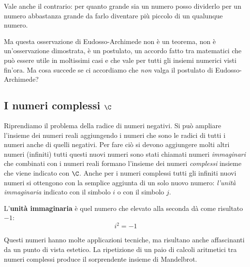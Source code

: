 Vale anche il contrario: per quanto grande sia un numero posso dividerlo 
per un numero abbastanza grande da farlo diventare più piccolo di un 
qualunque numero.

Ma questa osservazione di Eudosso-Archimede non è un teorema, non è 
un'osservazione dimostrata, è un postulato, un accordo fatto tra matematici 
che può essere utile in moltissimi casi e che vale per tutti gli insiemi 
numerici visti fin'ora. 
Ma cosa succede se ci accordiamo che \emph{non} valga il postulato di 
Eudosso-Archimede?

\subsection{I numeri complessi \(\C\)}
\label{subsec:insnum_complessi}

Riprendiamo il problema della radice di numeri negativi. Si può ampliare 
l'insieme dei numeri reali aggiungendo i numeri che sono le 
radici di tutti i numeri anche di quelli negativi. Per fare ciò si devono 
aggiungere molti altri numeri (infiniti) tutti questi nuovi numeri sono 
stati chiamati numeri \emph{immaginari} che combinati con i numeri reali 
formano l'insieme dei numeri \emph{complessi} insieme che viene indicato 
con 
\(\C\). 
Anche per i numeri complessi tutti gli infiniti nuovi numeri si ottengono 
con la semplice aggiunta di un solo nuovo numero: \emph{l'unità 
immaginaria} indicato con il simbolo \(i\) o con il simbolo \(j\).
\begin{definizione}
 L'\textbf{unità immaginaria} è quel numero che elevato alla seconda dà 
come risultato \(-1\):
\[i^2 = -1\]
\end{definizione}

Questi numeri hanno molte applicazioni tecniche, ma risultano anche 
affascinanti da un punto di vista estetico. La ripetizione di un paio di 
calcoli aritmetici tra numeri complessi produce il sorprendente insieme di 
Mandelbrot.

